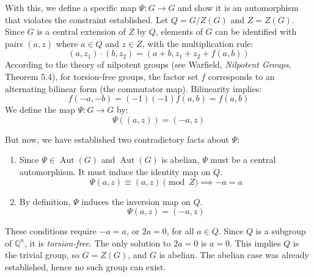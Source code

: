 \documentclass{book}
\newcommand{\Q}{{\mathbb{Q}}}
\newcommand{\Aut}{{\operatorname{Aut}}}
\newcommand{\Hom}{{\operatorname{Hom}}}
\newcommand{\Inn}{{\operatorname{Inn}}}
\begin{document}
%
%


With this, we define a specific map $\Psi: G \to G$ and show it is an automorphism that violates the
constraint established.
Let $Q = G/Z(G)$ and $Z = Z(G)$. Since $G$ is a central extension of $Z$ by $Q$, elements of $G$ can be identified with pairs $(a, z)$ where $a \in Q$ and $z \in Z$, with the multiplication rule:
\[
(a, z_1) \cdot (b, z_2) = (a+b, z_1 + z_2 + f(a, b))
\]
According to the theory of nilpotent groups (see Warfield, \textit{Nilpotent Groups}, Theorem 5.4), for
torsion-free groups, the factor set $f$ corresponds to an alternating bilinear form (the commutator map).
Bilinearity implies:
\[
f(-a, -b) = (-1)(-1)f(a, b) = f(a, b)
\]
We define the map $\Psi: G \to G$ by:
\[
\Psi((a, z)) = (-a, z)
\]

But now, we have established two contradictory facts about $\Psi$:
\begin{enumerate}
    \item  Since $\Psi \in \operatorname{Aut}(G)$ and $\operatorname{Aut}(G)$ is abelian, $\Psi$ must be a central automorphism. It must induce the identity map on $Q$.
    \[ \Psi(a, z) \equiv (a, z) \pmod Z \implies -a = a \]
    \item  By definition, $\Psi$ induces the inversion map on $Q$.
    \[ \Psi(a, z) = (-a, z) \]
\end{enumerate}
These conditions require $-a = a$, or $2a = 0$, for all $a \in Q$.
Since $Q$ is a subgroup of $\mathbb{Q}^n$, it is \emph{torsion-free}. The only solution to $2a=0$ is $a=0$.
This implies $Q$ is the trivial group, so $G = Z(G)$, and $G$ is abelian. The abelian case was already
established, hence no such group can exist.
\end{document}
